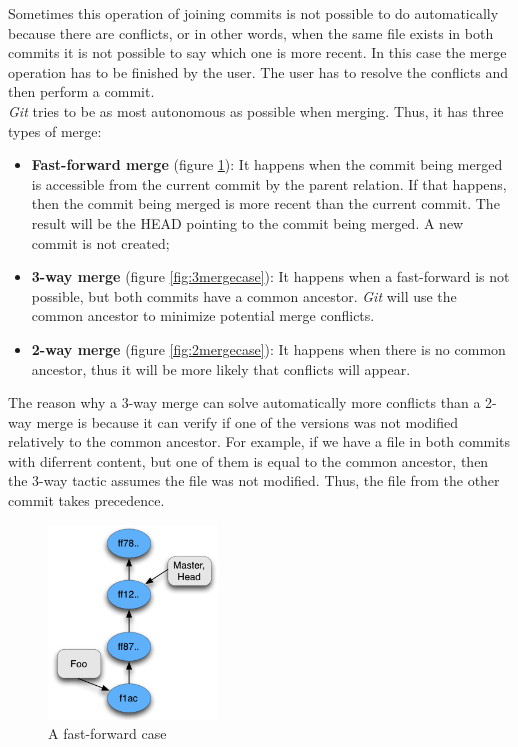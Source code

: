 Sometimes this operation of joining commits is not possible to do
automatically because there are conflicts, or in other words, when
the same file exists in both commits it is
not possible to say which one is more recent. In this case the merge
operation has to be finished by the user. The user has to resolve the
conflicts and then perform a commit.\\

\emph{Git} tries to be as most autonomous as possible when merging.
Thus, it has three types of merge:

\begin{itemize}
   \item \textbf{Fast-forward merge} (figure \ref{fig:fast_forward}):
   It happens when the commit being merged is accessible from the current commit by the 
   parent relation. If that happens, then the commit being merged is more recent
   than the current commit. The result will be the HEAD pointing to
   the commit being merged. A new commit is not created;
   
   \item \textbf{3-way merge} (figure \ref{fig:3mergecase}): 
   It happens when a fast-forward is not possible, but both commits have a common
   ancestor. \emph{Git} will use the common ancestor to minimize potential
   merge conflicts.
   
   \item \textbf{2-way merge} (figure \ref{fig:2mergecase}): 
   It happens when there is no
   common ancestor, thus it will be more likely that conflicts will
   appear.
\end{itemize}

The reason why a 3-way merge can solve automatically more conflicts than a 2-way
merge is because it can verify if one of the versions was not modified
relatively to the common ancestor. For example, if we have a file in
both commits with diferrent content, but one of them is equal to the
common ancestor, then the 3-way tactic assumes the file was not modified. Thus,
the file from the other commit takes precedence.

\begin{figure}[tp]
   \centering
   \includegraphics[width=0.4\textwidth]{images/fast_forward.png}
   \caption{A fast-forward case}\label{fig:fast_forward}
\end{figure}

